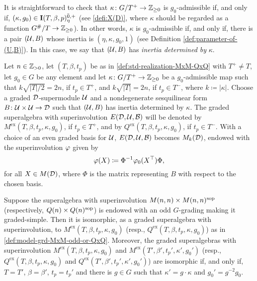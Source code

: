 It is straightforward to check that $\kappa\colon G/T^+ \to \mathbb{Z}_{\geq 0}$ is $g_0$-admissible if, and only if, $(\kappa, g_0) \in \mathbf{I}(T,\beta,p)^{{\bar{0}}, +}_\eta$ (see \cref{defi:X(D)}, where $\kappa$ should be regarded as a function $G^\#/T \to \mathbb{Z}_{\geq 0}$). 
In other words, $\kappa$ is $g_0$-admissible if, and only if, there is a pair $(\mathcal U, B)$ whose inertia is $(\eta, \kappa, g_0, 1)$ (see Definition \ref{def:parameter-of-(U,B)}). 
In this case, we say that $(\mathcal U, B)$ has \emph{inertia determined by} $\kappa$. 


\begin{defi}\label{def:model-grd-MxM-odd-or-QxQ}
    Let $n\in \mathbb{Z}_{> 0}$, 
    let $(T, \beta, t_p)$ be as in \cref{def:std-realization-MxM-QxQ} with $T^+ \neq T$, 
    let $g_0 \in G$ be any element and
    let $\kappa\colon G/T^+ \to \mathbb{Z}_{\geq 0}$ be a $g_0$-admissible map such that $k \sqrt{|T|/2} = 2n$, if $t_p \in T^+$, and $k \sqrt{|T|} = 2n$, if $t_p \in T^-$, where $k \coloneqq |\kappa|$.
    Choose a graded $\mathcal{D}$-supermodule $\mathcal U$ and a nondegenerate sesquilinear form $B\colon \mathcal U\times \mathcal U \to \mathcal{D}$ such that $(\mathcal U, B)$ has inertia determined by $\kappa$. 
    The graded superalgebra with superinvolution $E(\mathcal{D}, \mathcal U, \mathcal B)$ will be denoted by $M^{\mathrm{ex}}(T, \beta, t_p, \kappa, g_0)$, if $t_p \in T^+$, and by $Q^{\mathrm{ex}}(T, \beta, t_p, \kappa, g_0)$, if $t_p \in T^-$. 
    With a choice of an even graded basis for $\mathcal U$, $E(\mathcal{D}, \mathcal U, \mathcal B)$ becomes $M_k (\mathcal{D})$, endowed with the superinvolution $\varphi$ given by 
    \[
        \varphi(X) \coloneqq \Phi^{-1} \varphi_0(X^{\top}) \Phi,
    \]
    for all $X \in M(\mathcal{D})$, where $\Phi$ is the matrix representing $B$ with respect to the chosen basis. 
\end{defi}

\begin{thm}\label{thm:MxM-odd}
    Suppose the superalgebra with superinvolution $M(n,n) \times M(n,n)^{\mathrm{sop}}$ (respectively, $Q(n) \times Q(n)^{\mathrm{sop}}$) is endowed with an odd $G$-grading making it graded-simple. 
    Then it is isomorphic, as a graded superalgebra with superinvolution, to $M^{\mathrm{ex}}(T,\beta, t_p, \kappa, g_0)$ (resp., $Q^{\mathrm{ex}}(T,\beta, t_p, \kappa, g_0)$) as in \cref{def:model-grd-MxM-odd-or-QxQ}. 
    Moreover, the graded superalgebras with superinvolution $M^{\mathrm{ex}} (T, \beta,  t_p, \kappa, g_0)$  and $M^{\mathrm{ex}} (T', \beta',  t_p', \kappa', g_0')$ (resp., $Q^{\mathrm{ex}} (T, \beta,  t_p, \kappa, g_0)$ and $Q^{\mathrm{ex}} (T', \beta',  t_p', \kappa', g_0')$) are isomorphic if, and only if, $T =T'$, $\beta = \beta'$, $t_p = t_p'$ and there is $g \in G$ such that $\kappa' = g\cdot\kappa$ and $g_0' = g^{-2}g_0$. 
\end{thm}

